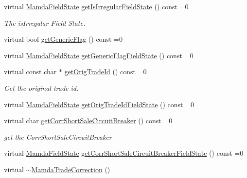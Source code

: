 \begin{CompactItemize}
virtual \hyperlink{namespaceWombat_93aac974f2ab713554fd12a1fa3b7d2a}{Mamda\-Field\-State} \hyperlink{classWombat_1_1MamdaTradeCorrection_50f8278176ef9d0f2eba3bda2f299fdd}{get\-Is\-Irregular\-Field\-State} () const =0
\begin{CompactList}\small\item\em The is\-Irregular Field State. \item\end{CompactList}\item 
virtual bool \hyperlink{classWombat_1_1MamdaTradeCorrection_910eefbcd0095d44cd615d3fec76701d}{get\-Generic\-Flag} () const =0
\item 
virtual \hyperlink{namespaceWombat_93aac974f2ab713554fd12a1fa3b7d2a}{Mamda\-Field\-State} \hyperlink{classWombat_1_1MamdaTradeCorrection_31dbf48a3740fb8c349dce93d311c1d9}{get\-Generic\-Flag\-Field\-State} () const =0
\item 
virtual const char $\ast$ \hyperlink{classWombat_1_1MamdaTradeCorrection_a68503dc9dfcd36a5a20889ce4a207af}{get\-Orig\-Trade\-Id} () const =0
\begin{CompactList}\small\item\em Get the original trade id. \item\end{CompactList}\item 
virtual \hyperlink{namespaceWombat_93aac974f2ab713554fd12a1fa3b7d2a}{Mamda\-Field\-State} \hyperlink{classWombat_1_1MamdaTradeCorrection_83e5e5027f10de660714a6bc9e283e6c}{get\-Orig\-Trade\-Id\-Field\-State} () const =0
\item 
virtual char \hyperlink{classWombat_1_1MamdaTradeCorrection_6e5f69c0e6bb8cf2a4a2d25ef83f7aac}{get\-Corr\-Short\-Sale\-Circuit\-Breaker} () const =0
\begin{CompactList}\small\item\em get the Corr\-Short\-Sale\-Circuit\-Breaker \item\end{CompactList}\item 
virtual \hyperlink{namespaceWombat_93aac974f2ab713554fd12a1fa3b7d2a}{Mamda\-Field\-State} \hyperlink{classWombat_1_1MamdaTradeCorrection_742b32f2bbf95daea48b555fb78f556d}{get\-Corr\-Short\-Sale\-Circuit\-Breaker\-Field\-State} () const =0
\item 
virtual \hyperlink{classWombat_1_1MamdaTradeCorrection_b4d18a65d80de13f1a889dce7055a47a}{$\sim$Mamda\-Trade\-Correction} ()
\end{CompactItemize}


